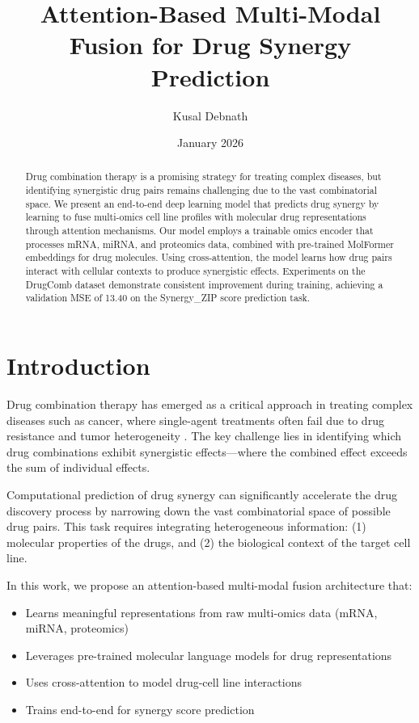 \documentclass[10pt,twocolumn]{article}
\title{\textbf{Attention-Based Multi-Modal Fusion for Drug Synergy Prediction}}
\author{Kusal Debnath}
\date{January 2026}
\begin{document}
\maketitle

\begin{abstract}
Drug combination therapy is a promising strategy for treating complex diseases, but identifying synergistic drug pairs remains challenging due to the vast combinatorial space. We present an end-to-end deep learning model that predicts drug synergy by learning to fuse multi-omics cell line profiles with molecular drug representations through attention mechanisms. Our model employs a trainable omics encoder that processes mRNA, miRNA, and proteomics data, combined with pre-trained MolFormer embeddings for drug molecules. Using cross-attention, the model learns how drug pairs interact with cellular contexts to produce synergistic effects. Experiments on the DrugComb dataset demonstrate consistent improvement during training, achieving a validation MSE of 13.40 on the Synergy\_ZIP score prediction task.
\end{abstract}

\section{Introduction}

Drug combination therapy has emerged as a critical approach in treating complex diseases such as cancer, where single-agent treatments often fail due to drug resistance and tumor heterogeneity \cite{drugcomb}. The key challenge lies in identifying which drug combinations exhibit synergistic effects---where the combined effect exceeds the sum of individual effects.

Computational prediction of drug synergy can significantly accelerate the drug discovery process by narrowing down the vast combinatorial space of possible drug pairs. This task requires integrating heterogeneous information: (1) molecular properties of the drugs, and (2) the biological context of the target cell line.

In this work, we propose an attention-based multi-modal fusion architecture that:
\begin{itemize}
    \item Learns meaningful representations from raw multi-omics data (mRNA, miRNA, proteomics)
    \item Leverages pre-trained molecular language models for drug representations
    \item Uses cross-attention to model drug-cell line interactions
    \item Trains end-to-end for synergy score prediction
\end{itemize}
\end{document}
